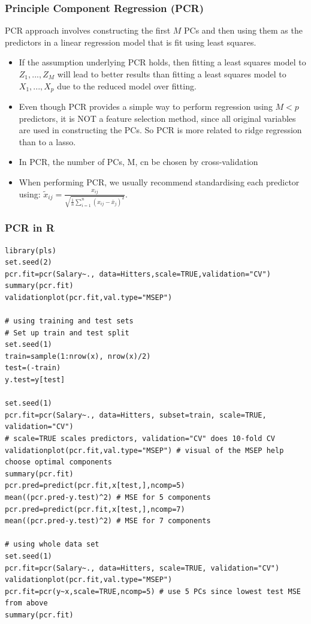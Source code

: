 \documentclass[11pt]{article}
\begin{document}
\subsubsection{Principle Component Regression (PCR)}
\noindent PCR approach involves constructing the first $M$ PCs and then using them as the predictors in a linear regression model that is fit using least squares.
\begin{itemize}
    \item If the assumption underlying PCR holds, then fitting a least squares model to $Z_1,...,Z_M$ will lead to better results than fitting a least squares model to $X_1,...,X_p$ due to the reduced model over fitting.
    \item Even though PCR provides a simple way to perform regression using $M < p$ predictors, it is NOT a feature selection method, since all original variables are used in constructing the PCs. So PCR is more related to ridge regression than to a lasso.
    \item In PCR, the number of PCs, M, cn be chosen by cross-validation
    \item When performing PCR, we usually recommend standardising each predictor using: $\tilde{x}_{ij} = \frac{x_{ij}}{\sqrt{\frac{1}{n}\sum_{i=1}^{n}{(x_{ij} - \bar{x}_{j})^2}}}$.
\end{itemize}

\subsubsection{PCR in R}
\begin{lstlisting}
library(pls)
set.seed(2)
pcr.fit=pcr(Salary~., data=Hitters,scale=TRUE,validation="CV")
summary(pcr.fit)
validationplot(pcr.fit,val.type="MSEP")

# using training and test sets
# Set up train and test split
set.seed(1)
train=sample(1:nrow(x), nrow(x)/2)
test=(-train)
y.test=y[test]

set.seed(1)
pcr.fit=pcr(Salary~., data=Hitters, subset=train, scale=TRUE, validation="CV")
# scale=TRUE scales predictors, validation="CV" does 10-fold CV
validationplot(pcr.fit,val.type="MSEP") # visual of the MSEP help choose optimal components
summary(pcr.fit)
pcr.pred=predict(pcr.fit,x[test,],ncomp=5)
mean((pcr.pred-y.test)^2) # MSE for 5 components
pcr.pred=predict(pcr.fit,x[test,],ncomp=7)
mean((pcr.pred-y.test)^2) # MSE for 7 components

# using whole data set
set.seed(1)
pcr.fit=pcr(Salary~., data=Hitters, scale=TRUE, validation="CV")
validationplot(pcr.fit,val.type="MSEP")
pcr.fit=pcr(y~x,scale=TRUE,ncomp=5) # use 5 PCs since lowest test MSE from above
summary(pcr.fit)
\end{lstlisting}
\end{document}

